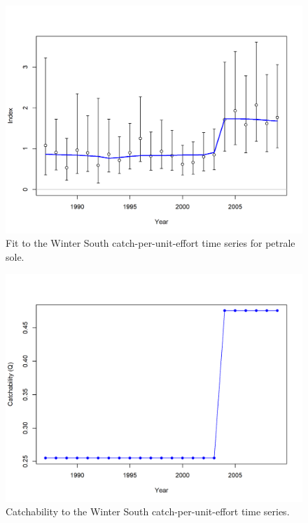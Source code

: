 \documentclass[12pt,]{article}
\begin{document}
\FloatBarrier

\begin{figure}
\centering
\includegraphics{r4ss/plots_mod1/index2_cpuefit_Winter (S).png}
\caption{Fit to the Winter South catch-per-unit-effort time series for
petrale sole. \label{fig:fit_ws_cpue}}
\end{figure}

\FloatBarrier

\begin{figure}
\centering
\includegraphics{r4ss/plots_mod1/index7_timevaryingQ_Winter (S).png}
\caption{Catchability to the Winter South catch-per-unit-effort time
series. \label{fig:q_south}}
\end{figure}
\end{document}
